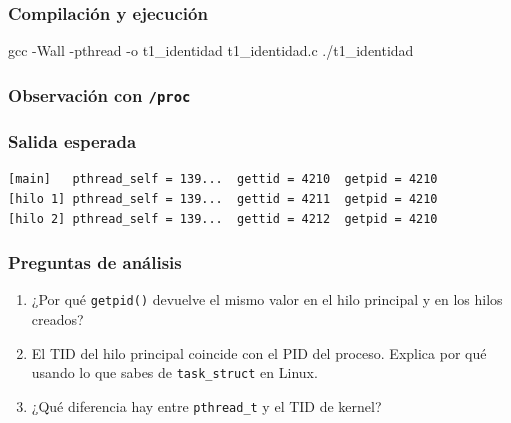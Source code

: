 \documentclass[
  spanish,
]{article}
\newenvironment{Shaded}{}{}
\newcommand{\AttributeTok}[1]{\textcolor[rgb]{0.49,0.56,0.16}{#1}}
\newcommand{\CommentTok}[1]{\textcolor[rgb]{0.38,0.63,0.69}{\textit{#1}}}
\newcommand{\ExtensionTok}[1]{#1}
\newcommand{\FunctionTok}[1]{\textcolor[rgb]{0.02,0.16,0.49}{#1}}
\newcommand{\KeywordTok}[1]{\textcolor[rgb]{0.00,0.44,0.13}{\textbf{#1}}}
\newcommand{\NormalTok}[1]{#1}
\newcommand{\OperatorTok}[1]{\textcolor[rgb]{0.40,0.40,0.40}{#1}}
\newcommand{\VariableTok}[1]{\textcolor[rgb]{0.10,0.09,0.49}{#1}}
\providecommand{\tightlist}{%
  \setlength{\itemsep}{0pt}\setlength{\parskip}{0pt}}
\begin{document}
\subsubsection{Compilación y
ejecución}\label{compilaciuxf3n-y-ejecuciuxf3n}

\begin{Shaded}
\begin{Highlighting}[]
\FunctionTok{gcc} \AttributeTok{{-}Wall} \AttributeTok{{-}pthread} \AttributeTok{{-}o}\NormalTok{ t1\_identidad t1\_identidad.c}
\ExtensionTok{./t1\_identidad}
\end{Highlighting}
\end{Shaded}

\subsubsection{\texorpdfstring{Observación con
\texttt{/proc}}{Observación con /proc}}\label{observaciuxf3n-con-proc}

\begin{Shaded}
\end{Shaded}

\subsubsection{Salida esperada}\label{salida-esperada}

\begin{verbatim}
[main]   pthread_self = 139...  gettid = 4210  getpid = 4210
[hilo 1] pthread_self = 139...  gettid = 4211  getpid = 4210
[hilo 2] pthread_self = 139...  gettid = 4212  getpid = 4210
\end{verbatim}

\subsubsection{Preguntas de análisis}\label{preguntas-de-anuxe1lisis}

\begin{enumerate}
\def\labelenumi{\arabic{enumi}.}
\tightlist
\item
  ¿Por qué \texttt{getpid()} devuelve el mismo valor en el hilo
  principal y en los hilos creados?
\item
  El TID del hilo principal coincide con el PID del proceso. Explica por
  qué usando lo que sabes de \texttt{task\_struct} en Linux.
\item
  ¿Qué diferencia hay entre \texttt{pthread\_t} y el TID de kernel?
\end{enumerate}
\end{document}
